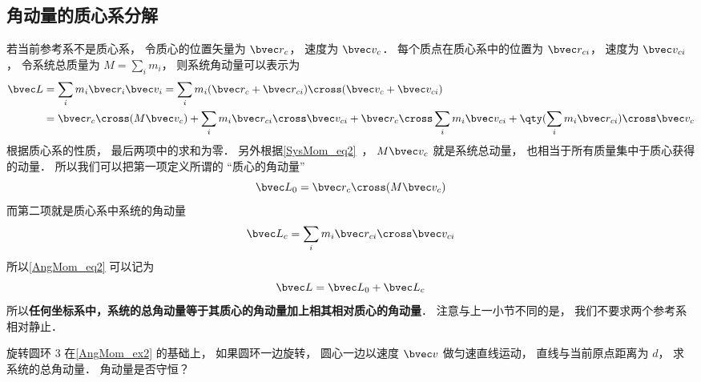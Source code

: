 \subsection{角动量的质心系分解}
若当前参考系不是质心系， 令质心的位置矢量为 $\bvec r_c$， 速度为 $\bvec v_c$． 每个质点在质心系中的位置为 $\bvec r_{ci}$， 速度为 $\bvec v_{ci}$， 令系统总质量为 $M = \sum_i m_i$， 则系统角动量可以表示为
\begin{equation}\label{AngMom_eq2}
\begin{aligned}
\bvec L &= \sum_i m_i \bvec r_i \bvec v_i = \sum_i m_i (\bvec r_c + \bvec r_{ci})\cross( \bvec v_c + \bvec v_{ci})\\
&= \bvec r_c \cross (M\bvec v_c) + \sum_i m_i \bvec r_{ci}\cross \bvec v_{ci} + \bvec r_c \cross \sum_i m_i \bvec v_{ci} + \qty(\sum_i m_i \bvec r_{ci}) \cross \bvec v_c
\end{aligned}
\end{equation}
根据质心系的性质， 最后两项中的求和为零． 另外根据\autoref{SysMom_eq2}~， $M\bvec v_c$ 就是系统总动量， 也相当于所有质量集中于质心获得的动量． 所以我们可以把第一项定义所谓的 “质心的角动量”
\begin{equation}
\bvec L_0 = \bvec r_c \cross (M \bvec v_c)
\end{equation}
而第二项就是质心系中系统的角动量
\begin{equation}
\bvec L_c = \sum_i m_i \bvec r_{ci}\cross \bvec v_{ci}
\end{equation}
所以\autoref{AngMom_eq2} 可以记为
\begin{equation}\label{AngMom_eq3}
\bvec L = \bvec L_0 + \bvec L_c
\end{equation}
所以\textbf{任何坐标系中，系统的总角动量等于其质心的角动量加上相其相对质心的角动量}． 注意与上一小节不同的是， 我们不要求两个参考系相对静止．

\begin{exercise}{旋转圆环 3}
在\autoref{AngMom_ex2} 的基础上， 如果圆环一边旋转， 圆心一边以速度 $\bvec v$ 做匀速直线运动， 直线与当前原点距离为 $d$， 求系统的总角动量． 角动量是否守恒？
\end{exercise}
